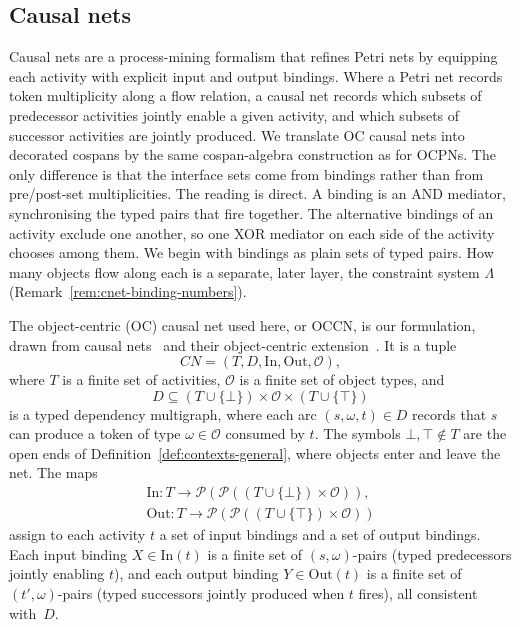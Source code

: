 
\subsection{Causal nets}\label{sec:causal-nets}

Causal nets are a process-mining formalism that refines Petri nets by equipping each activity with explicit input and output bindings. Where a Petri net records token multiplicity along a flow relation, a causal net records which subsets of predecessor activities jointly enable a given activity, and which subsets of successor activities are jointly produced. We translate OC causal nets into decorated cospans by the same cospan-algebra construction as for OCPNs. The only difference is that the interface sets come from bindings rather than from pre/post-set multiplicities. The reading is direct. A binding is an AND mediator, synchronising the typed pairs that fire together. The alternative bindings of an activity exclude one another, so one XOR mediator on each side of the activity chooses among them. We begin with bindings as plain sets of typed pairs. How many objects flow along each is a separate, later layer, the constraint system $\Lambda$ (Remark~\ref{rem:cnet-binding-numbers}).

\begin{definition}
  \label{def:causal-net}
  The object-centric (OC) causal net used here, or OCCN, is our formulation, drawn from causal
  nets~\cite{vanderaalstCausalNetsModeling2011} and their object-centric
  extension~\cite{lissObjectCentricCausalNets2025}. It is a tuple
  \[
    CN=(T,D,\mathrm{In},\mathrm{Out},\mathcal{O}),
  \]
  where \(T\) is a finite set of activities, \(\mathcal{O}\) is a finite set of object types, and
  \[
    D\subseteq (T\cup\{\bot\})\times\mathcal{O}\times (T\cup\{\top\})
  \]
  is a typed dependency multigraph, where each arc $(s,\omega,t)\in D$ records that $s$ can produce a token of type $\omega\in\mathcal{O}$ consumed by $t$. The symbols $\bot,\top\notin T$ are the open ends of Definition~\ref{def:contexts-general}, where objects enter and leave the net. The maps
  \begin{gather*}
    \mathrm{In}:T\to \mathcal{P}(\mathcal{P}((T\cup\{\bot\})\times\mathcal{O})),\\
    \mathrm{Out}:T\to \mathcal{P}(\mathcal{P}((T\cup\{\top\})\times\mathcal{O}))
  \end{gather*}
  assign to each activity $t$ a set of input bindings and a set of output bindings. Each input binding $X\in \mathrm{In}(t)$ is a finite set of $(s,\omega)$-pairs (typed predecessors jointly enabling $t$), and each output binding $Y\in \mathrm{Out}(t)$ is a finite set of $(t',\omega)$-pairs (typed successors jointly produced when $t$ fires), all consistent with~$D$.
\end{definition}


